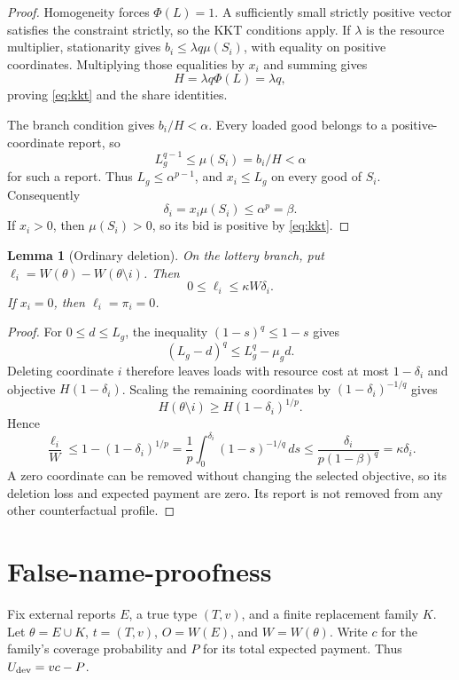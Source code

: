 \documentclass[11pt]{article}
\newtheorem{lemma}[theorem]{Lemma}
\begin{document}
\begin{proof}
Homogeneity forces $\Phi(L)=1$.
A sufficiently small strictly positive vector satisfies the
constraint strictly, so the KKT conditions apply.
If $\lambda$ is the resource multiplier, stationarity gives
$b_i\le\lambda q\mu(S_i)$, with equality on positive coordinates.
Multiplying those equalities by $x_i$ and summing gives
\[
H=\lambda q\Phi(L)=\lambda q,
\]
proving \eqref{eq:kkt} and the share identities.

The branch condition gives $b_i/H<\alpha$.
Every loaded good belongs to a positive-coordinate report, so
\[
L_g^{q-1}
\le\mu(S_i)
=b_i/H
<\alpha
\]
for such a report.
Thus $L_g\le\alpha^{p-1}$, and $x_i\le L_g$ on every good of $S_i$.
Consequently
\[
\delta_i=x_i\mu(S_i)\le\alpha^p=\beta.
\]
If $x_i>0$, then $\mu(S_i)>0$, so its bid is positive by
\eqref{eq:kkt}.
\end{proof}

\begin{lemma}[Ordinary deletion]
\label{lem:ordinary-deletion}
On the lottery branch, put
$\ell_i=W(\theta)-W(\theta\setminus i)$.
Then
\begin{equation}
\label{eq:ordinary-deletion}
0\le\ell_i\le\kappa W\delta_i.
\end{equation}
If $x_i=0$, then $\ell_i=\pi_i=0$.
\end{lemma}

\begin{proof}
For $0\le d\le L_g$, the inequality $(1-s)^q\le1-s$ gives
\[
(L_g-d)^q\le L_g^q-\mu_gd.
\]
Deleting coordinate $i$ therefore leaves loads with resource cost
at most $1-\delta_i$ and objective $H(1-\delta_i)$.
Scaling the remaining coordinates by $(1-\delta_i)^{-1/q}$ gives
\[
H(\theta\setminus i)
\ge H(1-\delta_i)^{1/p}.
\]
Hence
\[
\frac{\ell_i}{W}
\le1-(1-\delta_i)^{1/p}
=\frac1p\int_0^{\delta_i}(1-s)^{-1/q}\,ds
\le\frac{\delta_i}{p(1-\beta)^q}
=\kappa\delta_i.
\]
A zero coordinate can be removed without changing the selected
objective, so its deletion loss and expected payment are zero.
Its report is not removed from any other counterfactual profile.
\end{proof}


\section{False-name-proofness}

Fix external reports $E$, a true type $(T,v)$, and a finite
replacement family $K$.
Let $\theta=E\cup K$, $t=(T,v)$, $O=W(E)$, and $W=W(\theta)$.
Write $c$ for the family's coverage probability and $P$ for its
total expected payment.
Thus $U_{\rm dev}=vc-P$.
\end{document}
